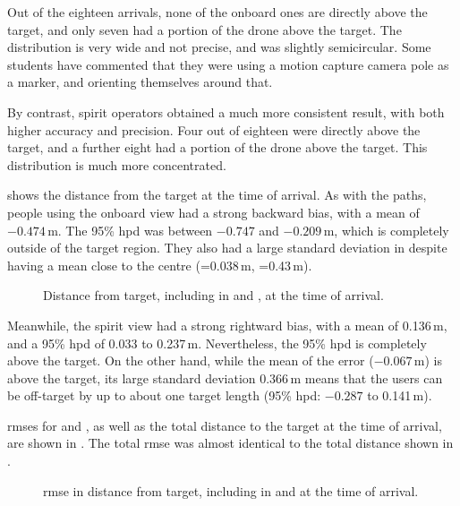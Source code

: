   Out of the eighteen arrivals, none of the onboard ones are directly above the target, and only seven had a portion of the drone above the target.
  The distribution is very wide and not precise, and was slightly semicircular.
  Some students have commented that they were using a motion capture camera pole as a marker, and orienting themselves around that.

  By contrast, \gls{spirit} operators obtained a much more consistent result, with both higher accuracy and precision.
  Four out of eighteen were directly above the target, and a further eight had a portion of the drone above the target.
  This distribution is much more concentrated.

   shows the distance from the target at the time of arrival.
  As with the paths, people using the onboard view had a strong backward bias, with a mean of $-0.474$\,m.
  The 95\% \gls{hpd} was between $-0.747$ and $-0.209$\,m, which is completely outside of the target region.
  They also had a large standard deviation in  despite having a mean close to the centre (=0.038\,m, =0.43\,m).


  \begin{figure}[h]
    \centering
    
    \caption[Arrival distance]{Distance from target, including in  and , at the time of arrival.}
    \label{fig:distance}
  \end{figure}

  Meanwhile, the \gls{spirit} view had a strong rightward bias, with a mean of 0.136\,m, and a 95\% \gls{hpd} of 0.033 to 0.237\,m.
  Nevertheless, the 95\% \gls{hpd} is completely above the target.
  On the other hand, while the mean of the  error ($-0.067$\,m) is above the target, its large standard deviation 0.366\,m means that the users can be off-target by up to about one target length (95\% \gls{hpd}: $-0.287$ to 0.141\,m).

  \glspl{rmse} for  and , as well as the total distance to the target at the time of arrival, are shown in .
  The total \gls{rmse} was almost identical to the total distance shown in .

  \begin{figure}[h]
    \centering
    
    \caption[Arrival RMS Error]{\gls{rmse} in distance from target, including in  and  at the time of arrival.}
    \label{fig:rmse}
  \end{figure}


